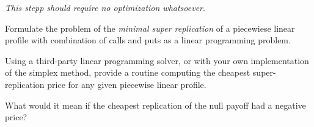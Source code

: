 \documentclass[a4paper]{article}
\newcommand{\1}{\textbf{1}}
\begin{document}
\par \emph{This stepp should require no optimization whatsoever}.

\par Formulate the problem of the \emph{minimal super replication} of a piecewiese linear profile with combination of calls and puts as a linear programming problem.

\par Using a third-party linear programming solver, or with your own implementation of the simplex method, provide a routine computing the cheapest super-replication price for any given piecewise linear profile.

\par What would it mean if the cheapest replication of the null payoff had a negative price?


\end{document}
